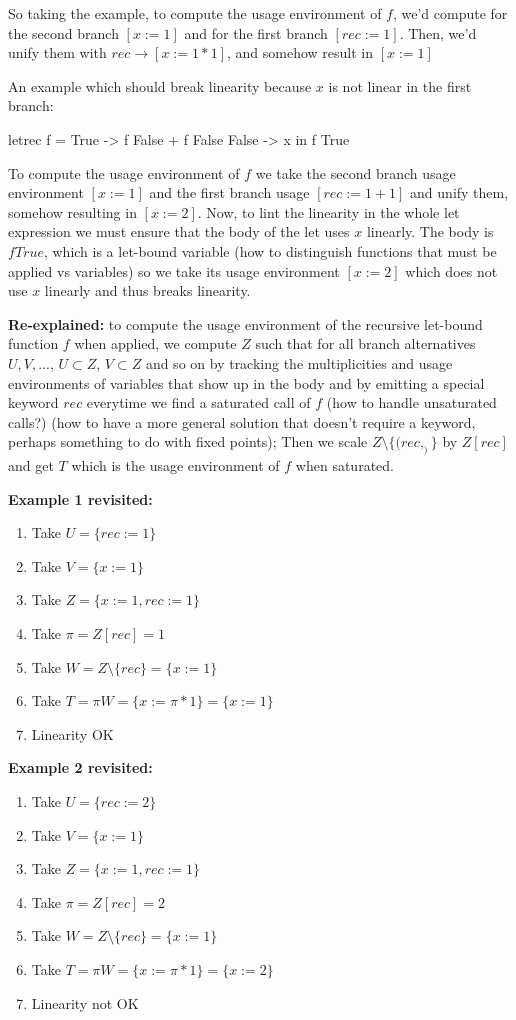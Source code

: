 \documentclass[a4paper, draft]{article}
\begin{document}
So taking the example, to compute the usage environment of $f$, we'd compute for
the second branch $[x := 1]$ and for the first branch $[rec := 1]$. Then, we'd
unify them with $rec \rightarrow [x := 1*1]$, and somehow result in $[x := 1]$

An example which should break linearity because $x$ is not linear in the first
branch:
\begin{code}
letrec f = \case
         True -> f False + f False
         False -> x
    in f True
\end{code}

To compute the usage environment of $f$ we take the second branch usage
environment $[x := 1]$ and the first branch usage $[rec := 1+1]$ and unify them,
somehow resulting in $[x := 2]$. Now, to lint the linearity in the whole let
expression we must ensure that the body of the let uses $x$ linearly. The body
is $f True$, which is a let-bound variable (how to distinguish functions that
must be applied vs variables) so we take its usage environment $[x := 2]$ which
does not use $x$ linearly and thus breaks linearity.

\textbf{Re-explained:} to compute the usage environment of the recursive
let-bound function $f$ when applied, we compute $Z$ such that for all branch
alternatives $U,V,...$, $U \subset Z$, $V \subset Z$ and so on by tracking the
multiplicities and usage environments of variables that show up in the body and
by emitting a special keyword $rec$ everytime we find a saturated call of $f$
(how to handle unsaturated calls?) (how to have a more general solution that
doesn't require a keyword, perhaps something to do with fixed points); Then we
scale $Z \setminus \{(rec,_)\}$ by $Z[rec]$ and get $T$ which is the usage
environment of $f$ when saturated.

\textbf{Example 1 revisited:}
\begin{enumerate}
    \item Take $U = \{rec := 1\}$
    \item Take $V = \{x := 1\}$
    \item Take $Z = \{x := 1, rec := 1\}$
    \item Take $\pi = Z[rec] = 1$
    \item Take $W = Z \setminus \{rec\} = \{x := 1\}$
    \item Take $T = \pi W = \{x := \pi * 1\} = \{x := 1\}$
    \item Linearity OK
\end{enumerate}

\textbf{Example 2 revisited:}
\begin{enumerate}
    \item Take $U = \{rec := 2\}$
    \item Take $V = \{x := 1\}$
    \item Take $Z = \{x := 1, rec := 1\}$
    \item Take $\pi = Z[rec] = 2$
    \item Take $W = Z \setminus \{rec\} = \{x := 1\}$
    \item Take $T = \pi W = \{x := \pi * 1\} = \{x := 2\}$
    \item Linearity not OK
\end{enumerate}
\end{document}
